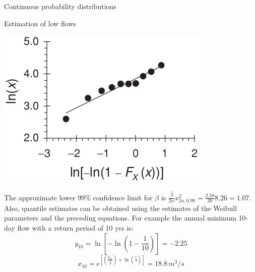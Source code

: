 \documentclass[8pt]{beamer}
\begin{document}
\begin{frame}{Continuous probability distributions}
\begin{exampleblock}{Estimation of low flows}
\vspace{-5pt}
\begin{minipage}{0.39\textwidth}
\centering
\includegraphics[width=1\linewidth]{fi427.png}  %
\end{minipage}
\hfill
\begin{minipage}{0.59\textwidth}
     The approximate lower 99\% confidence limit for $\beta$ is $\frac{\hat{\beta}}{2n} x_{2n,0.99}^2 = \frac{2.59}{20} 8.26 = 1.07$. Also, quantile estimates can be obtained using the estimates of the Weibull parameters and the preceding equations. For example the annual minimum 10-day flow with a return period of 10 yrs is: 
\vspace{-5pt}
     \[
         y_{10} = \ln \left[ - \ln \left( 1-\frac{1}{10} \right) \right] = -2.25
         \]
\vspace{-7pt}
         \[
             x_{10} = e^{\left[ \left( \frac{y_{10}}{\hat{\beta}} \right) +\ln (\hat{\lambda}) \right]} = 18.8\, m^3/s
         \]

\end{minipage}
   \end{exampleblock}
\end{frame}
\end{document}
